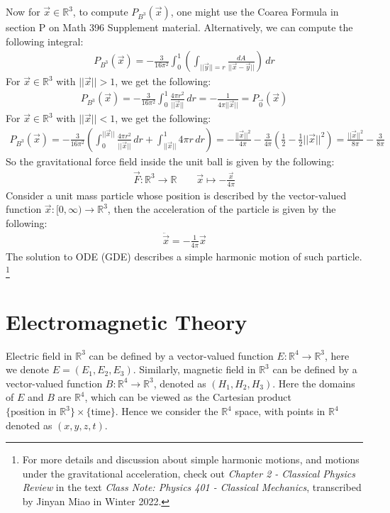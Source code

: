 \documentclass[11pt,oneside]{book}
\theoremstyle{break}
\theoremstyle{break}
\newcommand{\R}{\mathbb{R}}
\begin{document}
\hfill\break
Now for $\vec{x}\in \R^3$, to compute $P_{B^3}(\vec{x})$, one might use the Coarea Formula in section P on Math 396 Supplement material. Alternatively, we can compute the following integral:
\begin{align*}
P_{B^3}(\vec{x}) = -\frac{3}{16\pi^2}\int_0^1\left( \int_{||\vec{y}|| = r}\frac{dA}{||\vec{x}-\vec{y}||}\right)\, dr
\end{align*}
For $\vec{x}\in \R^3$ with $||\vec{x}||>1$, we get the following:
\begin{align*}
P_{B^3}(\vec{x})  = -\frac{3}{16\pi ^2}\int_0^1 \frac{4\pi r^2}{||\vec{x}||}\, dr = -\frac{1}{4\pi ||\vec{x}||} = P_{\vec{0}}(\vec{x})
\end{align*}
For $\vec{x}\in \R^3$ with $||\vec{x}|| <1$, we get the following:
\begin{align*}
P_{B^3}(\vec{x})  = -\frac{3}{16\pi^2}\left(\int_{0}^{||\vec{x}||}\frac{4\pi r^2}{||\vec{x}||}\, dr + \int_{||\vec{x}||}^1 4\pi r\, dr\right) = -\frac{||\vec{x}||^2}{4\pi}-\frac{3}{4\pi}\left(\frac{1}{2}-\frac{1}{2}||\vec{x}||^2\right) = \frac{||\vec{x}||^2}{8\pi} -\frac{3}{8\pi}
\end{align*}
So the gravitational force field inside the unit ball is given by the following:
\begin{align*}
\vec{F}: \R^3 \to \R \qquad \vec{x}\mapsto -\frac{\vec{x}}{4\pi}
\end{align*}
Consider a unit mass particle whose position is described by the vector-valued function $\vec{x}:[0,\infty) \to \R^3$, then the acceleration of the particle is given by the following:
\begin{align*}
\ddot{\vec{x}} = -\frac{1}{4\pi}\vec{x} \tag{GDE}
\end{align*}
The solution to ODE (GDE) describes a simple harmonic motion of such particle. \footnote{For more details and discussion about simple harmonic motions, and motions under the gravitational acceleration, check out \textit{Chapter 2 -  Classical Physics Review} in the text \textit{Class Note: Physics 401 - Classical Mechanics}, transcribed by Jinyan Miao in Winter 2022.}

\newpage
\section[Electromagnetic Theory]{\color{red}Electromagnetic Theory\color{black}}
Electric field in $\R^3$ can be defined by a vector-valued function $E:\R^4 \to \R^3$, here we denote $E = (E_1, E_2, E_3)$. Similarly, magnetic field in $\R^3$ can be defined by a vector-valued function $B :\R^4 \to \R^3$, denoted as $(H_1, H_2, H_3)$. Here the domains of $E$ and $B$ are $\R^4$, which can be viewed as the Cartesian product $\{\text{position in }\R^3\}\times \{\text{time}\}$. Hence we consider the $\R^4$ space, with points in $\R^4$ denoted as $(x,y,z,t)$.\\
\end{document}

